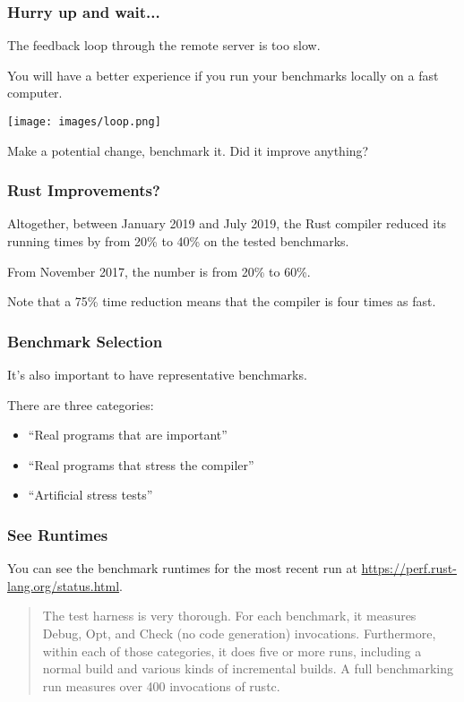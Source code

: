 \begin{frame}
\frametitle{Hurry up and wait...}

The feedback loop through the remote server is too slow. 

You will have a better experience if you run your benchmarks locally on a
fast computer.

\begin{center}
	\texttt{[image: images/loop.png]}
\end{center}

Make a potential change, benchmark it. Did it improve anything? 

\end{frame}

\begin{frame}
\frametitle{Rust Improvements?}

Altogether, between January 2019 and July 2019, the Rust compiler reduced
its running times by from 20\% to 40\% on the tested benchmarks.

From November 2017,
the number is from 20\% to 60\%. 

Note that a 75\% time reduction means that the compiler is four times as fast.

\end{frame}



\begin{frame}
\frametitle{Benchmark Selection}

It's also important to have representative benchmarks. 

There are three categories:\\
\begin{itemize}
	\item ``Real programs that are important'' 
	\item ``Real programs that stress the compiler''
	\item ``Artificial stress tests''
\end{itemize}

\end{frame}


\begin{frame}
\frametitle{See Runtimes}
You can see the benchmark runtimes for the most recent run at \url{https://perf.rust-lang.org/status.html}.

\begin{quote}
The test harness is very thorough. For each benchmark, it measures Debug, Opt, and Check (no code generation) invocations. Furthermore, within each of those categories, it does five or more runs, including a normal build and various kinds of incremental builds. A full benchmarking run measures over 400 invocations of rustc.
\end{quote}


\end{frame}

